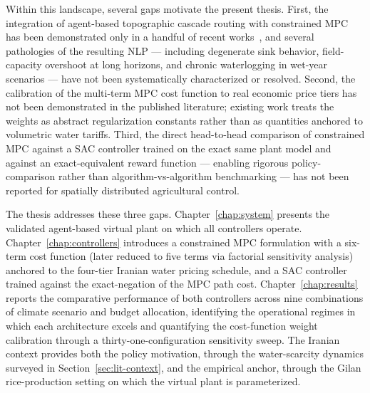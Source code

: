 Within this landscape, several gaps motivate the present thesis.
First, the integration of agent-based topographic cascade routing
with constrained MPC has been demonstrated only in a handful of
recent works~\cite{Lopezjimenez2024,LopezJimenez2022}, and several
pathologies of the resulting NLP --- including degenerate sink
behavior, field-capacity overshoot at long horizons, and chronic
waterlogging in wet-year scenarios --- have not been systematically
characterized or resolved. Second, the calibration of the multi-term
MPC cost function to real economic price tiers has not been
demonstrated in the published literature; existing work treats the
weights as abstract regularization constants rather than as
quantities anchored to volumetric water tariffs. Third, the direct
head-to-head comparison of constrained MPC against a SAC controller
trained on the exact same plant model and against an exact-equivalent
reward function --- enabling rigorous policy-comparison rather than
algorithm-vs-algorithm benchmarking --- has not been reported for
spatially distributed agricultural control.

The thesis addresses these three gaps. Chapter~\ref{chap:system}
presents the validated agent-based virtual plant on which all
controllers operate. Chapter~\ref{chap:controllers} introduces a
constrained MPC formulation with a six-term cost function (later
reduced to five terms via factorial sensitivity analysis) anchored to
the four-tier Iranian water pricing schedule, and a SAC controller
trained against the exact-negation of the MPC path cost.
Chapter~\ref{chap:results} reports the comparative performance of
both controllers across nine combinations of climate scenario and
budget allocation, identifying the operational regimes in which each
architecture excels and quantifying the cost-function weight
calibration through a thirty-one-configuration sensitivity sweep.
The Iranian context provides both the policy motivation, through the
water-scarcity dynamics surveyed in Section~\ref{sec:lit-context},
and the empirical anchor, through the Gilan rice-production setting
on which the virtual plant is parameterized.

